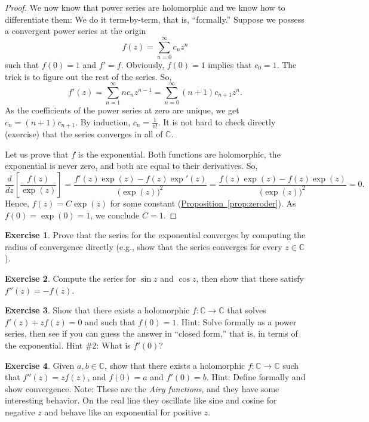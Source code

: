 \documentclass[12pt,openany]{book}
\newcommand{\C}{{\mathbb{C}}}
\newcommand{\myindex}[1]{#1\index{#1}}
\newcommand{\myquote}[1]{``#1''}
\theoremstyle{plain}
\theoremstyle{remark}
\theoremstyle{definition}
\newenvironment{exbox}{%
    \def\FrameCommand{\vrule width 1pt \relax\hspace{10pt}}%
    \MakeFramed{\advance\hsize-\width\FrameRestore}%
}{%
    \endMakeFramed
}
\theoremstyle{exercise}
\newtheorem{exercise}{Exercise}[section]
\theoremstyle{example}
\newcommand{\propref}[1]{\hyperref[#1]{Proposition~\ref*{#1}}}
\begin{document}
\begin{proof}
We now know that power series are holomorphic and we know how
to differentiate them: We do it term-by-term, that is, \myquote{formally.}
Suppose we possess a convergent power series at the origin
\begin{equation*}
f(z) = \sum_{n=0}^\infty c_n z^n
\end{equation*}
such that $f(0)=1$ and $f'=f$.
Obviously, $f(0)=1$ implies that $c_0 = 1$.
The trick is to figure out the rest of the series.
So,
\begin{equation*}
f'(z) =
\sum_{n=1}^\infty n c_n z^{n-1} =
\sum_{n=0}^\infty (n+1) c_{n+1} z^{n} .
\end{equation*}
As the coefficients of the power series at zero are unique, we get
$c_n = (n+1) c_{n+1}$.  By induction, $c_n = \frac{1}{n!}$.
It is not hard to check directly (exercise)
that the series converges in all of $\C$.

Let us prove that $f$ is the exponential.  Both functions are
holomorphic, the exponential is never zero, and both are equal to their
derivatives.  So,
\begin{equation*}
\frac{d}{dz} \left[ \frac{f(z)}{\exp(z)} \right]
=
\frac{f'(z)\exp(z) - f(z) \exp'(z)}{{\bigl(\exp(z)\bigr)}^2}
=
\frac{f(z)\exp(z) - f(z) \exp(z)}{{\bigl(\exp(z)\bigr)}^2}
= 0.
\end{equation*}
Hence, $f(z) = C \exp(z)$ for some constant (\propref{prop:zeroder}).
As $f(0) = \exp(0) = 1$,
we conclude $C=1$.
\end{proof}

\begin{exbox}
\begin{exercise}
Prove that the series for the exponential converges by computing
the radius of convergence directly
(e.g., show that the series converges for every $z \in \C$).
\end{exercise}

\begin{exercise}
Compute the series for $\sin z$ and $\cos z$, then show that these satisfy
$f''(z) = -f(z)$.
\end{exercise}

\begin{exercise}
Show that there exists a holomorphic $f \colon \C \to \C$ that
solves $f'(z) + z f(z) = 0$ and such that $f(0) = 1$.  Hint: Solve formally
as a power series,
then see if you can guess the answer in \myquote{closed form,} that is, in terms
of the exponential.  Hint \#2: What is $f'(0)$?
\end{exercise}

\begin{exercise}
Given $a,b \in \C$, show that there exists a holomorphic $f \colon \C \to
\C$ such that $f''(z) = z f(z)$, and $f(0) = a$ and $f'(0) = b$.
Hint: Define formally and show convergence.
Note: These are the \emph{\myindex{Airy functions}}, and they have some
interesting behavior.  On the real line they oscillate like sine and cosine
for negative $z$ and behave like an exponential for positive $z$.
\end{exercise}
\end{exbox}
\end{document}
